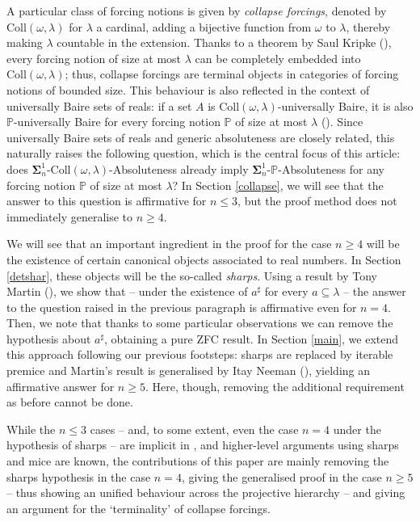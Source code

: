 \documentclass[10pt]{amsart}
\renewcommand\le\leqslant
\renewcommand\ge\geqslant
\theoremstyle{definition}
\begin{document}
A particular class of forcing notions is given by \emph{collapse forcings}, denoted by $\mathrm{Coll}(\omega,\lambda)$ for $\lambda$ a cardinal, adding a bijective function from $\omega$ to $\lambda$, thereby making $\lambda$ countable in the extension. Thanks to a theorem by Saul Kripke (\cite{Kripke}), every forcing notion of size at most $\lambda$ can be completely embedded into $\mathrm{Coll}(\omega,\lambda)$; thus, collapse forcings are terminal objects in categories of forcing notions of bounded size. This behaviour is also reflected in the context of universally Baire sets of reals: if a set $A$ is $\mathrm{Coll}(\omega,\lambda)$-universally Baire, it is also $\mathbb P$-universally Baire for every forcing notion $\mathbb P$ of size at most $\lambda$ (\cite{FMW}). Since universally Baire sets of reals and generic absoluteness are closely related, this naturally raises the following question, which is the central focus of this article: does $\boldsymbol\Sigma^1_n$-$\mathrm{Coll}(\omega,\lambda)$-Absoluteness already imply $\boldsymbol\Sigma^1_n$-$\mathbb P$-Absoluteness for any forcing notion $\mathbb P$ of size at most $\lambda$? In Section \ref{collapse}, we will see that the answer to this question is affirmative for $n\le3$, but the proof method does not immediately generalise to $n\ge4$. \medskip 

We will see that an important ingredient in the proof for the case $n\ge4$ will be the existence of certain canonical objects associated to real numbers. In Section \ref{detshar}, these objects will be the so-called \emph{sharps}. Using a result by Tony Martin (\cite{Martthisthat}), we show that -- under the existence of $a^\sharp$ for every $a\subseteq\lambda$ -- the answer to the question raised in the previous paragraph is affirmative even for $n=4$. Then, we note that thanks to some particular observations we can remove the hypothesis about $a^\sharp$, obtaining a pure ZFC result.  In Section \ref{main}, we extend this approach following our previous footsteps: sharps are replaced by iterable premice and Martin's result is generalised by Itay Neeman (\cite{Neeman}), yielding an affirmative answer for $n\ge5$. Here, though, removing the additional requirement as before cannot be done.\medskip

While the $n\le3$ cases -- and, to some extent, even the case $n=4$ under the hypothesis of sharps -- are implicit in \cite{FMW}, and higher-level arguments using sharps and mice are known, the contributions of this paper are mainly removing the sharps hypothesis in the case $n=4$, giving the generalised proof in the case $n\ge5$ -- thus showing an unified behaviour across the projective hierarchy -- and giving an argument for the `terminality' of collapse forcings.\medskip
\end{document}
